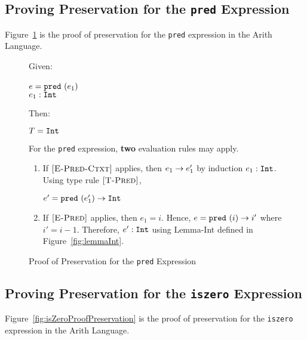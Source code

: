 \documentclass{report}
\newcommand{\rel}[1]{ \mbox{\sc [#1]} }
\begin{document}
\subsection{Proving Preservation for the \texttt{pred} Expression}

Figure~\ref{fig:predProofPreservation} is the proof of preservation for the \texttt{pred} expression in the Arith Language.

\begin{figure}[ht!]
Given:
\begin{center}
   $e = \mbox{\tt pred}~(e_1)$~\\
   ${e_1} : {\mbox{\tt Int}}$
\end{center}
Then:
\begin{center}
   $T = \mbox{\tt Int}$
\end{center}
For the \texttt{pred} expression, \textbf{two} evaluation rules may apply.
\begin{enumerate}

    \item If $\rel{E-Pred-Ctxt}$ applies, then ${e_1} \rightarrow {e'_1}$ by induction ${e_1} : {\mbox{\tt Int}}$.  Using type rule $\rel{T-Pred}$,
    
    \begin{center}
      ${e' = \mbox{\tt pred}~(e'_1)} \rightarrow {\mbox{\tt Int}}$
    \end{center}
      
    \item If $\rel{E-Pred}$ applies, then $e_1 = i$.  Hence, ${e = \mbox{\tt pred}~(i)} \rightarrow {i'}$ where $i' = i - 1$.  Therefore, ${e'} : {\mbox{\tt Int}}$ using Lemma-Int defined in Figure~\ref{fig:lemmaInt}.
    
\end{enumerate}

  \caption{Proof of Preservation for the \texttt{pred} Expression}\label{fig:predProofPreservation}
\end{figure} 

\subsection{Proving Preservation for the \texttt{iszero} Expression}

Figure~\ref{fig:isZeroProofPreservation} is the proof of preservation for the \texttt{iszero} expression in the Arith Language.
\end{document}
